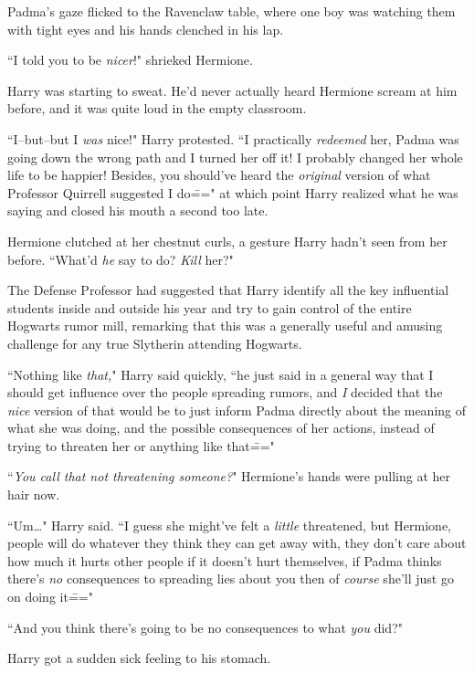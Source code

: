 Padma's gaze flicked to the Ravenclaw table, where one boy was watching them with tight eyes and his hands clenched in his lap.


``I told you to be \emph{nicer}!" shrieked Hermione.

Harry was starting to sweat. He'd never actually heard Hermione scream at him before, and it was quite loud in the empty classroom.

``I\---but\---but I \emph{was} nice!" Harry protested. ``I practically \emph{redeemed} her, Padma was going down the wrong path and I turned her off it! I probably changed her whole life to be happier! Besides, you should've heard the \emph{original} version of what Professor Quirrell suggested I do\===" at which point Harry realized what he was saying and closed his mouth a second too late.

Hermione clutched at her chestnut curls, a gesture Harry hadn't seen from her before. ``What'd \emph{he} say to do? \emph{Kill} her?"

The Defense Professor had suggested that Harry identify all the key influential students inside and outside his year and try to gain control of the entire Hogwarts rumor mill, remarking that this was a generally useful and amusing challenge for any true Slytherin attending Hogwarts.

``Nothing like \emph{that,}" Harry said quickly, ``he just said in a general way that I should get influence over the people spreading rumors, and \emph{I} decided that the \emph{nice} version of that would be to just inform Padma directly about the meaning of what she was doing, and the possible consequences of her actions, instead of trying to threaten her or anything like that\==="

``\emph{You call that not threatening someone?}" Hermione's hands were pulling at her hair now.

``Um{\ldots}" Harry said. ``I guess she might've felt a \emph{little} threatened, but Hermione, people will do whatever they think they can get away with, they don't care about how much it hurts other people if it doesn't hurt themselves, if Padma thinks there's \emph{no} consequences to spreading lies about you then of \emph{course} she'll just go on doing it\==="

``And you think there's going to be no consequences to what \emph{you} did?"

Harry got a sudden sick feeling to his stomach.

